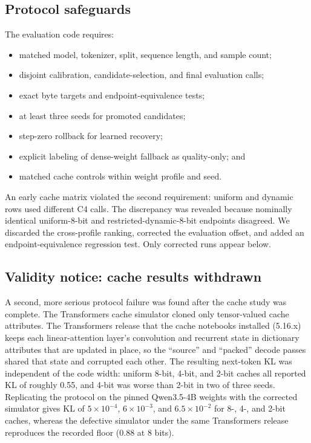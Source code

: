 \documentclass[10pt,twocolumn]{article}
\begin{document}
\subsection{Protocol safeguards}

The evaluation code requires:

\begin{itemize}
  \item matched model, tokenizer, split, sequence length, and sample count;
  \item disjoint calibration, candidate-selection, and final evaluation calls;
  \item exact byte targets and endpoint-equivalence tests;
  \item at least three seeds for promoted candidates;
  \item step-zero rollback for learned recovery;
  \item explicit labeling of dense-weight fallback as quality-only; and
  \item matched cache controls within weight profile and seed.
\end{itemize}

An early cache matrix violated the second requirement: uniform and dynamic rows
used different C4 calls. The discrepancy was revealed because nominally
identical uniform-8-bit and restricted-dynamic-8-bit endpoints disagreed. We
discarded the cross-profile ranking, corrected the evaluation offset, and added
an endpoint-equivalence regression test. Only corrected runs appear below.

\subsection{Validity notice: cache results withdrawn}
\label{sec:validity}

A second, more serious protocol failure was found after the cache study was
complete. The Transformers cache simulator cloned only tensor-valued cache
attributes. The Transformers release that the cache notebooks installed
(5.16.x) keeps each linear-attention layer's convolution and recurrent state in
dictionary attributes that are updated in place, so the ``source'' and
``packed'' decode passes shared that state and corrupted each other. The
resulting next-token KL was independent of the code width: uniform 8-bit,
4-bit, and 2-bit caches all reported KL of roughly 0.55, and 4-bit was worse
than 2-bit in two of three seeds. Replicating the protocol on the pinned
Qwen3.5-4B weights with the corrected simulator gives KL of $5\times10^{-4}$,
$6\times10^{-3}$, and $6.5\times10^{-2}$ for 8-, 4-, and 2-bit caches, whereas
the defective simulator under the same Transformers release reproduces the
recorded floor ($0.88$ at 8 bits).
\end{document}
